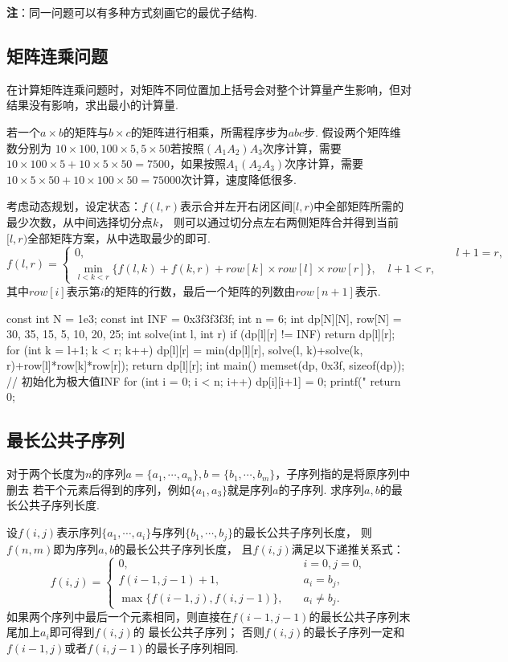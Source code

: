 \documentclass[12pt, a4paper, oneside]{ctexart}
\numberwithin{equation}{section}  %
\theoremstyle{definition}
\begin{document}
\textbf{注}：同一问题可以有多种方式刻画它的最优子结构.
\subsection{矩阵连乘问题}
在计算矩阵连乘问题时，对矩阵不同位置加上括号会对整个计算量产生影响，但对结果没有影响，求出最小的计算量.

若一个$a\times b$的矩阵与$b\times c$的矩阵进行相乘，所需程序步为$abc$步. 假设两个矩阵维数分别为
$10\times 100, 100\times 5, 5\times 50$若按照$(A_1A_2)A_3$次序计算，需要$10\times 100\times 5 +
10\times 5\times 50 = 7500$，如果按照$A_1(A_2A_3)$次序计算，需要
$10\times 5\times 50+10\times 100\times 50 = 75000$次计算，速度降低很多.

考虑动态规划，设定状态：$f(l,r)$表示合并左开右闭区间$[l,r)$中全部矩阵所需的最少次数，从中间选择切分点$k$，
则可以通过切分点左右两侧矩阵合并得到当前$[l,r)$全部矩阵方案，从中选取最少的即可.
\begin{equation*}
    f(l,r)=\begin{cases}
        0,&\quad l+1 = r,\\
        \min_{l < k < r}\{f(l, k) + f(k, r) + row[k]\times row[l]\times row[r]\},\quad l+1<r,
    \end{cases}
\end{equation*}
其中$row[i]$表示第$i$的矩阵的行数，最后一个矩阵的列数由$row[n+1]$表示.
\begin{cppcode}
const int N = 1e3;
const int INF = 0x3f3f3f3f;
int n = 6;
int dp[N][N], row[N] = {30, 35, 15, 5, 10, 20, 25};
int solve(int l, int r) {
    if (dp[l][r] != INF) return dp[l][r];
    for (int k = l+1; k < r; k++)
        dp[l][r] = min(dp[l][r], solve(l, k)+solve(k, r)+row[l]*row[k]*row[r]);
    return dp[l][r];
}
int main() {
    memset(dp, 0x3f, sizeof(dp));  // 初始化为极大值INF
    for (int i = 0; i < n; i++) dp[i][i+1] = 0;
    printf("%
    return 0;
}
\end{cppcode}
\subsection{最长公共子序列}
对于两个长度为$n$的序列$a=\{a_1,\cdots,a_n\},b=\{b_1,\cdots, b_m\}$，子序列指的是将原序列中删去
若干个元素后得到的序列，例如$\{a_1,a_3\}$就是序列$a$的子序列. 求序列$a,b$的最长公共子序列长度.

设$f(i,j)$表示序列$\{a_1,\cdots, a_i\}$与序列$\{b_1,\cdots, b_j\}$的最长公共子序列长度，
则$f(n, m)$即为序列$a,b$的最长公共子序列长度，
且$f(i,j)$满足以下递推关系式：
\begin{equation*}
    f(i,j) =  \begin{cases}
        0,&\quad i=0,j=0,\\
        f(i-1,j-1)+1,&\quad a_i=b_j,\\
        \max\{f(i-1,j),f(i,j-1)\},&\quad a_i\neq b_j.
    \end{cases}
\end{equation*}
如果两个序列中最后一个元素相同，则直接在$f(i-1,j-1)$的最长公共子序列末尾加上$a_i$即可得到$f(i,j)$的
最长公共子序列；
否则$f(i,j)$的最长子序列一定和$f(i-1,j)$或者$f(i,j-1)$的最长子序列相同.
\end{document}
